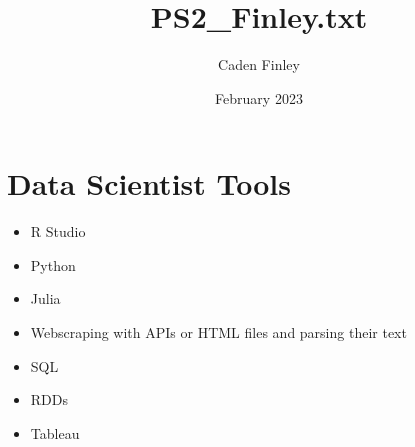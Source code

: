 \documentclass{article}
\title{PS2_Finley.txt}
\author{Caden Finley}
\date{February 2023}
\begin{document}
\maketitle

\section{Data Scientist Tools}

\begin{itemize}
\item R Studio
\item Python
\item Julia
\item Webscraping with APIs or HTML files and parsing their text
\item SQL
\item RDDs
\item Tableau
\end{itemize}
\end{document}
